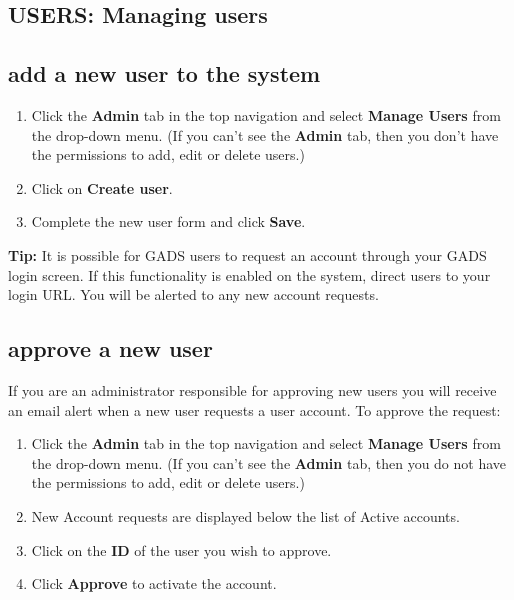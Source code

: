 \documentclass{ctrlo-int-toc}
\begin{document}
\begin{admin}
\clearpage\section[USERS: Managing users ]{USERS: Managing users }
\subsection[add a new user to the system ]{add a new user to the system }
\begin{enumerate}
\item Click the \textbf{Admin} tab in the top navigation and select \textbf{Manage Users} from the drop-down menu. (If you can't see the \textbf{Admin} tab, then you don't have the permissions to add, edit or delete users.)
\item Click on \textbf{Create user}.
\item Complete the new user form and click \textbf{Save}.
\end{enumerate}
\begin{tipbox}[userdefinedwidth=15cm]
\textbf{Tip:} It is possible for GADS users to request an account through your GADS login screen. If this functionality is enabled on the system, direct users to your login URL. You will be alerted to any new account requests. \ 
\end{tipbox}

\bigskip

\subsection[approve a new user ]{approve a new user }
If you are an administrator responsible for approving new users you will receive an email alert when a new user requests a user account. To approve the request:

\begin{enumerate}
    \item Click the \textbf{Admin} tab in the top navigation and select \textbf{Manage Users} from the drop-down menu. (If you can't see the \textbf{Admin} tab, then you do not have the permissions to add, edit or delete users.)
\item New Account requests are displayed below the list of Active accounts.
\item Click on the \textbf{ID} of the user you wish to approve.
\item Click \textbf{Approve} to activate the account.
\end{enumerate}

\end{admin}
\end{document}
